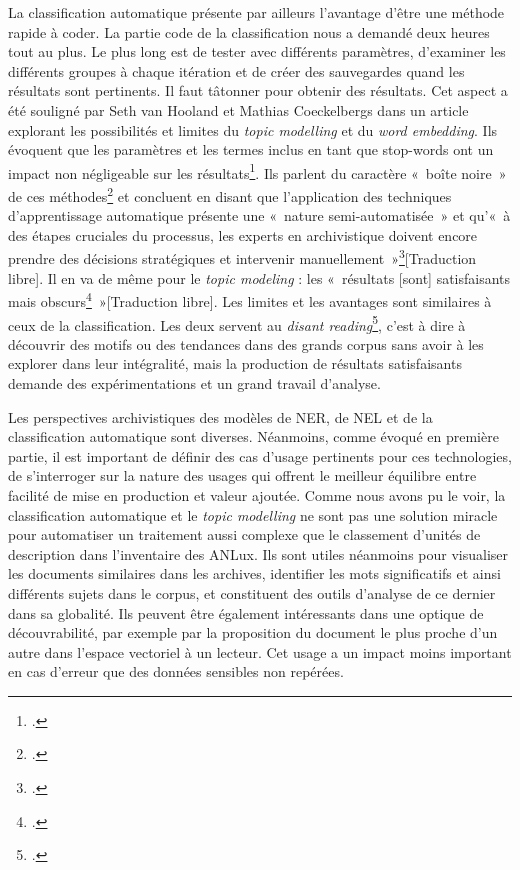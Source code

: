 La classification automatique présente par ailleurs l'avantage d'être une
méthode rapide à coder. La partie code de la
classification nous a demandé deux heures tout au plus.
Le plus long est de tester avec différents paramètres, d'examiner les
différents groupes à chaque itération et de créer des sauvegardes quand
les résultats sont pertinents. Il faut tâtonner pour obtenir des
résultats. Cet aspect a été souligné par Seth van Hooland et Mathias Coeckelbergs 
dans un article explorant les possibilités et limites du \emph{topic modelling} et du \emph{word embedding}. Ils évoquent que les paramètres et les termes inclus en tant que \gls{stop-words} ont un
impact non négligeable sur les résultats\footcite{van_hooland_unsupervised_2018}. Ils parlent du caractère «~boîte noire~» de ces
méthodes\footcite{van_hooland_unsupervised_2018} et concluent en disant que l'application
des techniques d'apprentissage automatique présente une «~nature
semi-automatisée~» et qu'«~à des étapes cruciales du processus, les
experts en archivistique doivent encore prendre des décisions
stratégiques et intervenir manuellement~»\footcite{van_hooland_unsupervised_2018}[Traduction libre]. Il en va
de même pour le \emph{topic modeling} : les «~résultats [sont] satisfaisants mais obscurs\footcite{meeks}~»[Traduction libre]. Les
limites et les avantages sont similaires à ceux de la classification.
Les deux servent au \emph{disant reading}\footcite{meeks}, c'est à dire
à découvrir des motifs ou des tendances dans des grands corpus sans
avoir à les explorer dans leur intégralité, mais la production de
résultats satisfaisants demande des expérimentations et un grand travail
d'analyse.\newline

Les perspectives archivistiques des modèles de \gls{NER}, de \gls{NEL} et de la
classification automatique sont diverses. Néanmoins, comme évoqué en
première partie, il est important de définir des cas d'usage pertinents
pour ces technologies, de s'interroger sur la nature des usages qui
offrent le meilleur équilibre entre facilité de mise en production et
valeur ajoutée. Comme nous avons pu le voir, la classification automatique et le \emph{topic
	modelling} ne sont pas une solution miracle pour automatiser un
traitement aussi complexe que le classement d'unités de description dans
l'inventaire des ANLux. Ils sont utiles néanmoins pour visualiser les
documents similaires dans les archives, identifier les mots
significatifs et ainsi différents sujets dans le corpus, et constituent
des outils d'analyse de ce dernier dans sa globalité. Ils peuvent être
également intéressants dans une optique de \gls{découvrabilité},
par exemple par la proposition du document le plus proche d'un autre
dans l'espace vectoriel à un lecteur. Cet usage a un impact moins
important en cas d'erreur que des données sensibles non repérées. 

